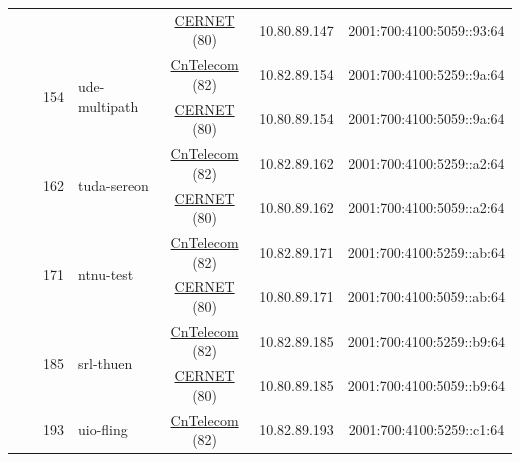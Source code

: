 \begin{small}
\begin{center}
\begin{longtable}{|c|c|c|c|c|c|c|c|}
  &  &  &  & \multicolumn{2}{|c|}{\tiny{\href{http://www.cernet.edu.cn}{CERNET} (80)}} & \tiny{10.80.89.147} & \tiny{2001:700:4100:5059::93:64} \\* \cline{3-3}\cline{4-4}\cline{5-5}\cline{6-6}\cline{7-7}\cline{8-8}
  &  & \multirow{2}{*}{\tiny{154}} & \multicolumn{1}{|l|}{\multirow{2}{*}{\tiny{ude-multipath}}} & \multicolumn{2}{|c|}{\tiny{\href{http://www.chinatelecom.com.cn}{CnTelecom} (82)}} & \tiny{10.82.89.154} & \tiny{2001:700:4100:5259::9a:64} \\* \cline{5-5}\cline{6-6}\cline{7-7}\cline{8-8}
  &  &  &  & \multicolumn{2}{|c|}{\tiny{\href{http://www.cernet.edu.cn}{CERNET} (80)}} & \tiny{10.80.89.154} & \tiny{2001:700:4100:5059::9a:64} \\* \cline{3-3}\cline{4-4}\cline{5-5}\cline{6-6}\cline{7-7}\cline{8-8}
  &  & \multirow{2}{*}{\tiny{162}} & \multicolumn{1}{|l|}{\multirow{2}{*}{\tiny{tuda-sereon}}} & \multicolumn{2}{|c|}{\tiny{\href{http://www.chinatelecom.com.cn}{CnTelecom} (82)}} & \tiny{10.82.89.162} & \tiny{2001:700:4100:5259::a2:64} \\* \cline{5-5}\cline{6-6}\cline{7-7}\cline{8-8}
  &  &  &  & \multicolumn{2}{|c|}{\tiny{\href{http://www.cernet.edu.cn}{CERNET} (80)}} & \tiny{10.80.89.162} & \tiny{2001:700:4100:5059::a2:64} \\* \cline{3-3}\cline{4-4}\cline{5-5}\cline{6-6}\cline{7-7}\cline{8-8}
  &  & \multirow{2}{*}{\tiny{171}} & \multicolumn{1}{|l|}{\multirow{2}{*}{\tiny{ntnu-test}}} & \multicolumn{2}{|c|}{\tiny{\href{http://www.chinatelecom.com.cn}{CnTelecom} (82)}} & \tiny{10.82.89.171} & \tiny{2001:700:4100:5259::ab:64} \\* \cline{5-5}\cline{6-6}\cline{7-7}\cline{8-8}
  &  &  &  & \multicolumn{2}{|c|}{\tiny{\href{http://www.cernet.edu.cn}{CERNET} (80)}} & \tiny{10.80.89.171} & \tiny{2001:700:4100:5059::ab:64} \\* \cline{3-3}\cline{4-4}\cline{5-5}\cline{6-6}\cline{7-7}\cline{8-8}
  &  & \multirow{2}{*}{\tiny{185}} & \multicolumn{1}{|l|}{\multirow{2}{*}{\tiny{srl-thuen}}} & \multicolumn{2}{|c|}{\tiny{\href{http://www.chinatelecom.com.cn}{CnTelecom} (82)}} & \tiny{10.82.89.185} & \tiny{2001:700:4100:5259::b9:64} \\* \cline{5-5}\cline{6-6}\cline{7-7}\cline{8-8}
  &  &  &  & \multicolumn{2}{|c|}{\tiny{\href{http://www.cernet.edu.cn}{CERNET} (80)}} & \tiny{10.80.89.185} & \tiny{2001:700:4100:5059::b9:64} \\* \cline{3-3}\cline{4-4}\cline{5-5}\cline{6-6}\cline{7-7}\cline{8-8}
  &  & \multirow{2}{*}{\tiny{193}} & \multicolumn{1}{|l|}{\multirow{2}{*}{\tiny{uio-fling}}} & \multicolumn{2}{|c|}{\tiny{\href{http://www.chinatelecom.com.cn}{CnTelecom} (82)}} & \tiny{10.82.89.193} & \tiny{2001:700:4100:5259::c1:64} \\* \cline{5-5}\cline{6-6}\cline{7-7}\cline{8-8}

\end{longtable}
\end{center}
\end{small}
